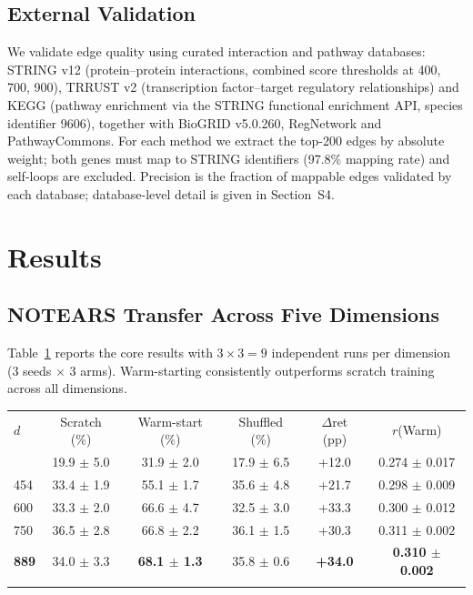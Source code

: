 \documentclass{ws-jbcb}
\begin{document}
\subsection{External Validation}

We validate edge quality using curated interaction and pathway databases: STRING v12\cite{szklarczyk2023} (protein--protein interactions, combined score thresholds at 400, 700, 900), TRRUST v2\cite{han2018trrust} (transcription factor--target regulatory relationships) and KEGG\cite{kanehisa2023kegg} (pathway enrichment via the STRING functional enrichment API, species identifier 9606), together with BioGRID v5.0.260, RegNetwork and PathwayCommons. For each method we extract the top-200 edges by absolute weight; both genes must map to STRING identifiers (97.8\% mapping rate) and self-loops are excluded. Precision is the fraction of mappable edges validated by each database; database-level detail is given in Section~S4.

\section{Results}

\subsection{NOTEARS Transfer Across Five Dimensions}

Table~\ref{tab:main} reports the core results with $3 \times 3 = 9$ independent runs per dimension (3 seeds $\times$ 3 arms). Warm-starting consistently outperforms scratch training across all dimensions.

\begin{table}[t]
{\small\begin{tabular}{@{}lccccc@{}} \toprule
$d$ & Scratch (\%) & Warm-start (\%) & Shuffled (\%) & $\Delta$ret (pp) & $r$(Warm)\\\colrule
200 & 19.9 $\pm$ 5.0 & 31.9 $\pm$ 2.0 & 17.9 $\pm$ 6.5 & +12.0 & 0.274 $\pm$ 0.017\\
454 & 33.4 $\pm$ 1.9 & 55.1 $\pm$ 1.7 & 35.6 $\pm$ 4.8 & +21.7 & 0.298 $\pm$ 0.009\\
600 & 33.3 $\pm$ 2.0 & 66.6 $\pm$ 4.7 & 32.5 $\pm$ 3.0 & +33.3 & 0.300 $\pm$ 0.012\\
750 & 36.5 $\pm$ 2.8 & 66.8 $\pm$ 2.2 & 36.1 $\pm$ 1.5 & +30.3 & 0.311 $\pm$ 0.002\\
\textbf{889} & 34.0 $\pm$ 3.3 & \textbf{68.1 $\pm$ 1.3} & 35.8 $\pm$ 0.6 & \textbf{+34.0} & \textbf{0.310 $\pm$ 0.002}\\
\botrule
\end{tabular}}
\label{tab:main}
\end{table}
\end{document}
